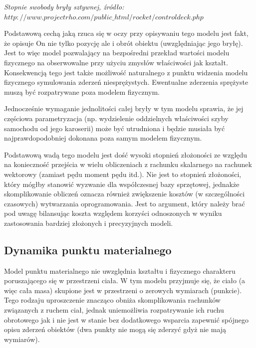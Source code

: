 \par{
\begin{center}
\textit{Stopnie swobody bryły sztywnej, źródło: $http://www.projectrho.com/public\_html/rocket/controldeck.php$}
\end{center}
}
\par{
Podstawową cechą jaką rzuca się w oczy przy opisywaniu tego modelu jest fakt, że opisuje On nie tylko pozycję ale i obrót obiektu (uwzględniając jego bryłę). Jest to więc model pozwalający na bezpośredni przekład wartości modelu fizycznego na obserwowalne przy użyciu zmysłów właściwości jak kształt. Konsekwencją tego jest także możliwość naturalnego z punktu widzenia modelu fizycznego symulowania zderzeń niesprężystych. Ewentualne zderzenia sprężyste muszą być rozpatrywane poza  modelem fizycznym.
}
\par{
Jednocześnie wymaganie jednolitości całej bryły w tym modelu sprawia, że jej częściowa parametryzacja (np. wydzielenie oddzielnych właściwości szyby samochodu od jego karoserii) może być utrudniona i będzie musiała być najprawdopodobniej dokonana poza samym modelem fizycznym.
}
\par{
Podstawową wadą tego modelu jest dość wysoki stopnień złożoności ze względu na konieczność przejścia w wielu obliczeniach z rachunku skalarnego na rachunek wektorowy (zamiast pędu moment pędu itd.). Nie jest to stopnień złożoności, który mógłby stanowić wyzwanie dla współczesnej bazy sprzętowej, jednakże skomplikowanie obliczeń oznacza również zwiększenie kosztów (w szczególności czasowych) wytwarzania oprogramowania. Jest to argument, który należy brać pod uwagę bilansując koszta względem korzyści odnoszonych w wyniku zastosowania bardziej złożonych i precyzyjnych modeli.
}

\subsection{Dynamika punktu materialnego}
\par{
Model punktu materialnego nie uwzględnia kształtu i fizycznego charakteru poruszającego się w przestrzeni ciała. W tym modelu przyjmuje się, że ciało (a więc cała masa) skupione jest w przestrzeni o zerowych wymiarach (punkcie). Tego rodzaju uproszczenie znacząco obniża skomplikowania rachunków związanych z ruchem ciał, jednak uniemożliwia rozpatrywanie ich ruchu obrotowego jak i nie jest w stanie bez dodatkowego wsparcia zapewnić spójnego opisu zderzeń obiektów (dwa punkty nie mogą się zderzyć gdyż nie mają wymiarów).
}

